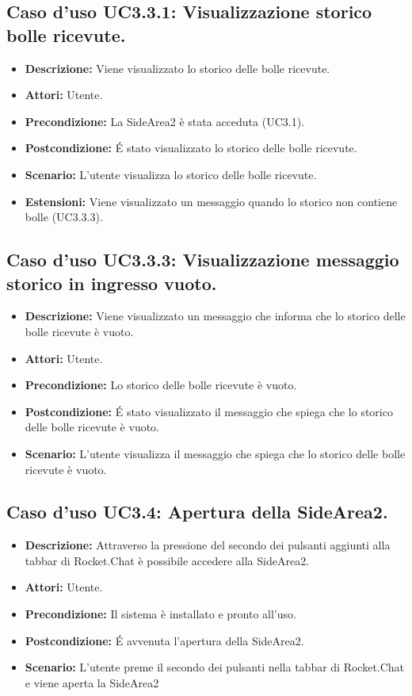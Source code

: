 \subsection{Caso d'uso UC3.3.1: Visualizzazione storico bolle ricevute.}
\begin{itemize}
\item[]\textbf{Descrizione:} Viene visualizzato lo storico delle bolle ricevute.
\item[]\textbf{Attori:} Utente. 
\item[]\textbf{Precondizione:} La SideArea2 è stata acceduta (UC3.1). 
\item[]\textbf{Postcondizione:} \'E stato visualizzato lo storico delle bolle ricevute. 
\item[]\textbf{Scenario:}
L'utente visualizza lo storico delle bolle ricevute. 
\item[]\textbf{Estensioni:}
Viene visualizzato un messaggio quando lo storico non contiene bolle (UC3.3.3). 
\end{itemize}

\subsection{Caso d'uso UC3.3.3: Visualizzazione messaggio storico in ingresso vuoto.}
\begin{itemize}
\item[]\textbf{Descrizione:} Viene visualizzato un messaggio che informa che lo storico delle bolle ricevute è vuoto.
\item[]\textbf{Attori:} Utente. 
\item[]\textbf{Precondizione:} Lo storico delle bolle ricevute è vuoto. 
\item[]\textbf{Postcondizione:} \'E stato visualizzato il messaggio che spiega che lo storico delle bolle ricevute è vuoto. 
\item[]\textbf{Scenario:}
L'utente visualizza il messaggio che spiega che lo storico delle bolle ricevute è vuoto. 
\end{itemize}

\subsection{Caso d'uso UC3.4: Apertura della SideArea2.}
\begin{itemize}
\item[]\textbf{Descrizione:} Attraverso la pressione del secondo dei pulsanti aggiunti alla tabbar di Rocket.Chat è possibile accedere alla SideArea2.
\item[]\textbf{Attori:} Utente. 
\item[]\textbf{Precondizione:} Il sistema è installato e pronto all'uso. 
\item[]\textbf{Postcondizione:} \'E avvenuta l'apertura della SideArea2. 
\item[]\textbf{Scenario:}
L'utente preme il secondo dei pulsanti nella tabbar di Rocket.Chat e viene aperta la SideArea2 
\end{itemize}

